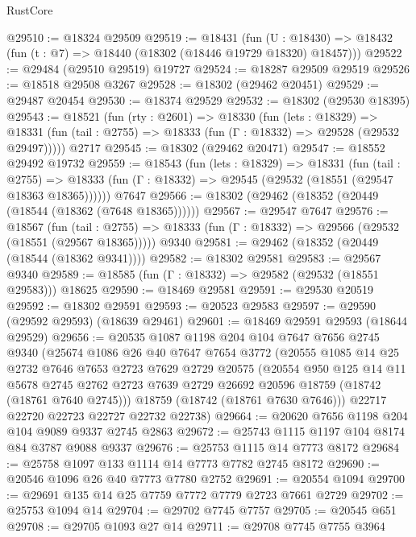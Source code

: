\begin{lexlean}{RustCore}
\begin{coremodule}
@29510 := @18324 @29509
@29519 := @18431
    (fun (U : @18430) => @18432 (fun (t : @7) => @18440 (@18302 (@18446 @19729 @18320) @18457)))
@29522 := @29484 (@29510 @29519) @19727
@29524 := @18287 @29509 @29519
@29526 := @18518 @29508 @3267
@29528 := @18302 (@29462 @20451)
@29529 := @29487 @20454
@29530 := @18374 @29529
@29532 := @18302 (@29530 @18395)
@29543 := @18521
    (fun (rty : @2601) =>
    @18330
      (fun (lets : @18329) =>
      @18331 (fun (tail : @2755) => @18333 (fun (Γ : @18332) => @29528 (@29532 @29497)))))
    @2717
@29545 := @18302 (@29462 @20471)
@29547 := @18552 @29492 @19732
@29559 := @18543
    (fun (lets : @18329) =>
    @18331
      (fun (tail : @2755) =>
      @18333 (fun (Γ : @18332) => @29545 (@29532 (@18551 (@29547 @18363 @18365))))))
    @7647
@29566 := @18302 (@29462 (@18352 (@20449 (@18544 (@18362 (@7648 @18365))))))
@29567 := @29547 @7647
@29576 := @18567
    (fun (tail : @2755) => @18333 (fun (Γ : @18332) => @29566 (@29532 (@18551 (@29567 @18365)))))
    @9340
@29581 := @29462 (@18352 (@20449 (@18544 (@18362 @9341))))
@29582 := @18302 @29581
@29583 := @29567 @9340
@29589 := @18585 (fun (Γ : @18332) => @29582 (@29532 (@18551 @29583))) @18625
@29590 := @18469 @29581
@29591 := @29530 @20519
@29592 := @18302 @29591
@29593 := @20523 @29583
@29597 := @29590 (@29592 @29593) (@18639 @29461)
@29601 := @18469 @29591 @29593 (@18644 @29529)
@29656 := @20535
    @1087
    @1198
    @204
    @104
    @7647
    @7656
    @2745
    @9340
    (@25674
      @1086
      @26
      @40
      @7647
      @7654
      @3772
      (@20555
        @1085
        @14
        @25
        @2732
        @7646
        @7653
        @2723
        @7629
        @2729
        @20575
        (@20554
          @950
          @125
          @14
          @11
          @5678
          @2745
          @2762
          @2723
          @7639
          @2729
          @26692
          @20596
          @18759
          (@18742 (@18761 @7640 @2745)))
        @18759
        (@18742 (@18761 @7630 @7646)))
      @22717
      @22720
      @22723
      @22727
      @22732
      @22738)
@29664 := @20620 @7656 @1198 @204 @104 @9089 @9337 @2745 @2863
@29672 := @25743 @1115 @1197 @104 @8174 @84 @3787 @9088 @9337
@29676 := @25753 @1115 @14 @7773 @8172
@29684 := @25758 @1097 @133 @1114 @14 @7773 @7782 @2745 @8172
@29690 := @20546 @1096 @26 @40 @7773 @7780 @2752
@29691 := @20554 @1094
@29700 := @29691 @135 @14 @25 @7759 @7772 @7779 @2723 @7661 @2729
@29702 := @25753 @1094 @14
@29704 := @29702 @7745 @7757
@29705 := @20545 @651
@29708 := @29705 @1093 @27 @14
@29711 := @29708 @7745 @7755 @3964

\end{coremodule}
\end{lexlean}
